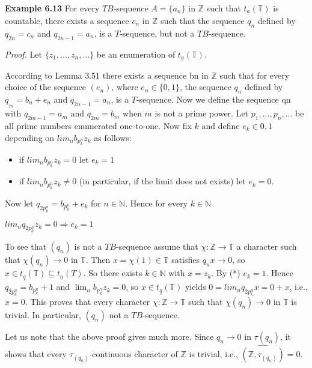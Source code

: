 \documentclass[12pt]{article}
\begin{document}
\begin{itemize}
\begin{itemize}
\textbf{Example 6.13} For every $TB$-sequence $A = \{a_n\}$ in $\mathbb{Z}$ such that $t_\underline{a}(\mathbb{T})$ is countable, there exists a sequence ${c_n}$
in $\mathbb{Z}$ such that the sequence $q_n$ defined by $q_{2n} = c_n$ and $q_{2n-1} = a_n$, is a $T$-sequence, but not a $TB$-sequence.


\emph{Proof.} Let $\{z_1, . . . , z_n, . . .\}$ be an enumeration of $t_{\underline{a}} (\mathbb{T})$.


    According to Lemma 3.51 there exists a sequence bn in $\mathbb{Z}$ such that for every choice of the sequence $(e_n)$,
where $e_n \in \{0, 1\}$, the sequence $q_n$ defined by $q__{2n} = b_n + e_n$ and $q_{2n-1} = a_n$, is a $T$-sequence. Now we define
the sequence qn with $q_{2m-1} = a_m$ and $q_{2m} = b_m$ when $m$ is not a prime power. Let $p_1, . . . , p_n, . . .$ be all prime
numbers enumerated one-to-one. Now fix $k$ and define $e_k \in {0, 1}$ depending on $lim_n b_{p^n_k} z_k$ as follows:


\begin{itemize}

    \item if $lim_n b_{p^n_k} z_k = 0$ let $e_k = 1$ 

    \item if $lim_n b_{p^n_k} z_k \neq 0$ (in particular, if the limit does not exists) let $e_k = 0$. 

\end{itemize}


Now let $q_{2p^n_k} = b_{p^n_k} + e_k$ for $n \in \mathbb{N}$. Hence for every $k \in \mathbb{N}$


    $lim_n q_{2p^n_k} z_k = 0 \Rightarrow e_k = 1$


    To see that $(q_n)$ is not a $TB$-sequence assume that $\chi : \mathbb{Z} \to \mathbb{T}$ a character such that $\chi(q_n) \to 0$ in $\mathbb{T}$. Then
$x = \chi(1) \in \mathbb{T}$ satisfies $q_n x \to 0$, so $x \in t_{\underline{q}}(\mathbb{T}) \subseteq t_{\underline{a}}(T)$. So there exists $k \in \mathbb{N}$ with $x = z_k$. By (*) $e_k = 1$. Hence
$q_{2p^n_k} = b_{p^n_k}+ 1$ and $\lim_n b_{p^n_k} z_k = 0$, so $x \in t_{\underline{q}}(\mathbb{T})$ yields $0 = lim_n q_{2p^n_k}x = 0 + x$, i.e., $x = 0$. This proves that
every character $\chi : \mathbb{Z} \to \mathbb{T}$ such that $\chi(q_n) \to 0$ in $\mathbb{T}$ is trivial. In particular, $(q_n)$ not a $TB$-sequence.


    Let us note that the above proof gives much more. Since $q_n \to 0$ in $\tau(q_n)$, it shows that every $\tau_{(q_n)}$-continuous
character of $\mathbb{Z}$ is trivial, i.e., $\hat{(\mathbb{Z}, \tau_{(q_n)})} = 0$.



\end{itemize}
\end{itemize}
\end{document}
